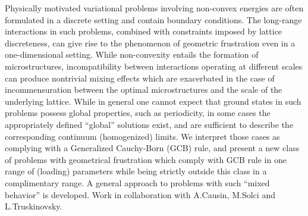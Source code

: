 \newpage
{}
\begin{myabstract}
Physically motivated variational problems involving non-convex energies are often formulated in a discrete setting and contain boundary conditions.  The long-range interactions in such problems, combined with constraints imposed by lattice discreteness, can give rise to the phenomenon of geometric frustration even in a one-dimensional setting. While non-convexity entails the formation of microstructures, incompatibility between interactions operating at different scales can produce nontrivial mixing effects which are exacerbated in the case of incommensuration between the optimal microstructures and the scale of the underlying lattice. While in general one cannot expect that ground states in such problems possess global properties, such as periodicity, in some cases the appropriately defined ``global'' solutions exist, and are sufficient to describe the corresponding continuum (homogenized) limits. We interpret those cases as complying with a Generalized Cauchy-Born (GCB) rule, and present a new class of problems with geometrical frustration which comply with GCB rule in one range of (loading) parameters while being strictly outside this class in a complimentary range. A general approach to problems with such ``mixed behavior'' is developed. Work in collaboration with A.Causin, M.Solci and L.Truskinovsky.
\end{myabstract}

